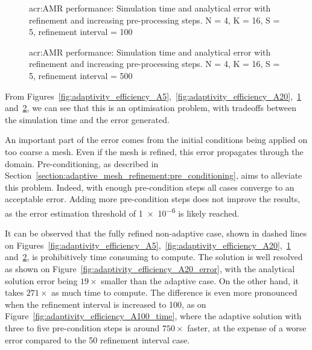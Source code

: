 \begin{figure}[H]
	\centering
	\hfill
	\caption{\Acrlong{acr:AMR} performance: Simulation time and analytical error with refinement and increasing pre-processing steps. N = 4, K = 16, S = 5, refinement interval = 100}\label{fig:adaptivity_efficiency_A100}
\end{figure}

\begin{figure}[H]
	\centering
	\hfill
	\caption{\Acrlong{acr:AMR} performance: Simulation time and analytical error with refinement and increasing pre-processing steps. N = 4, K = 16, S = 5, refinement interval = 500}\label{fig:adaptivity_efficiency_A500}
\end{figure}

From
Figures~\ref{fig:adaptivity_efficiency_A5},~\ref{fig:adaptivity_efficiency_A20},~\ref{fig:adaptivity_efficiency_A100}
and~\ref{fig:adaptivity_efficiency_A500}, we can see that this is an optimisation problem, with
tradeoffs between the simulation time and the error generated.

An important part of the error comes from the initial conditions being applied on too coarse a mesh.
Even if the mesh is refined, this error propagates through the domain. Pre-conditioning, as
described in Section~\ref{section:adaptive_mesh_refinement:pre_conditioning}, aims to alleviate this
problem. Indeed, with enough pre-condition steps all cases converge to an acceptable error. Adding
more pre-condition steps does not improve the results, as the error estimation threshold of
\num{1e-6} is likely reached.

It can be observed that the fully refined non-adaptive case, shown in dashed lines on
Figures~\ref{fig:adaptivity_efficiency_A5},~\ref{fig:adaptivity_efficiency_A20},~\ref{fig:adaptivity_efficiency_A100}
and~\ref{fig:adaptivity_efficiency_A500}, is prohibitively time consuming to compute. The solution
is well resolved as shown on Figure~\ref{fig:adaptivity_efficiency_A20_error}, with the analytical
solution error being \(19 \times \) smaller than the adaptive case. On the other hand, it takes
\(271 \times \) as much time to compute. The difference is even more pronounced when the refinement
interval is increased to 100, as on Figure~\ref{fig:adaptivity_efficiency_A100_time}, where the
adaptive solution with three to five pre-condition steps is around \(750 \times \) faster, at the
expense of a worse error compared to the 50 refinement interval case.

